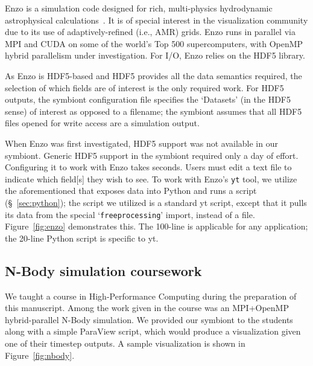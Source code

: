 Enzo is a simulation code designed for rich, multi-physics hydrodynamic
astrophysical calculations~\cite{Enzo:2013}.  It is of special interest
in the visualization community due to its use of adaptively-refined
(i.e., AMR) grids.  Enzo runs in parallel via MPI and CUDA on some of
the world's Top 500 supercomputers, with OpenMP hybrid parallelism
under investigation.  For I/O, Enzo relies on the HDF5 library.

As Enzo is HDF5-based and HDF5 provides all the data semantics
required, the selection of which fields are of interest is the only
required work.  For HDF5 outputs, the symbiont configuration file
specifies the `Datasets' (in the HDF5 sense) of interest as opposed to
a filename; the symbiont assumes that all HDF5 files opened for write
access are a simulation output.

When Enzo was first investigated, HDF5 support was not available in our
symbiont.  Generic HDF5 support in the symbiont required only a day of
effort.  Configuring it to work with Enzo takes seconds. Users must
edit a text file to indicate which field[s] they wish to see.  To work
with
Enzo's \texttt{yt} tool, we utilize the aforementioned
\freeprocessor{} that exposes data into Python and runs a script
(\S~\ref{sec:python}); the script we utilized is a standard yt script,
except that it
pulls its data from the special `\texttt{freeprocessing}' import,
instead of a file.  Figure~\ref{fig:enzo} demonstrates this.  The
100-line \freeprocessor{} is applicable for any \insitu{} application;
the 20-line Python script is specific to yt.

%

\subsection{N-Body simulation coursework}

We taught a course in High-Performance Computing during the preparation
of this manuscript.  Among the work given in the course was an
MPI+OpenMP hybrid-parallel N-Body simulation.  We provided our symbiont
to the students along with a simple ParaView script, which would
produce a visualization given one of their timestep outputs.  A sample
visualization is
shown in Figure~\ref{fig:nbody}.

